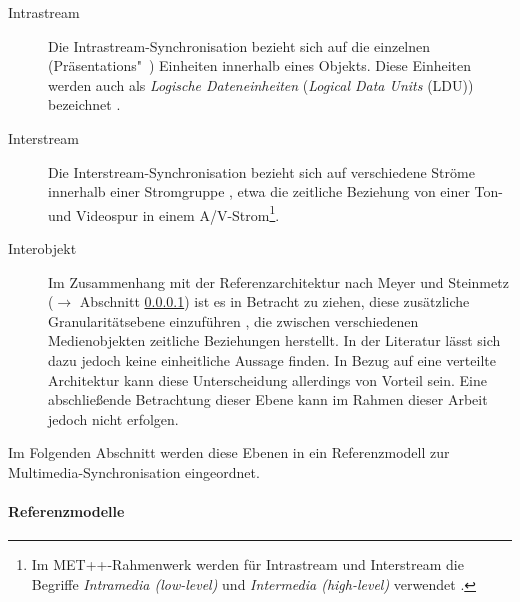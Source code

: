   \begin{description}
    \item[Intrastream] Die Intrastream-Synchronisation bezieht sich auf die einzelnen (Präsen\-tations"~) Einheiten innerhalb eines Objekts. Diese Einheiten werden auch als \emph{Logische Dateneinheiten} (\emph{Logical Data Units} (LDU)) bezeichnet \citep{steinmetz1990spm}.
    \item[Interstream] Die Interstream-Synchronisation bezieht sich auf verschiedene Ströme innerhalb einer Stromgruppe \citep{multimedia_technologie}, etwa die zeitliche Beziehung von einer Ton- und Videospur in einem A/V-Strom\footnote{Im MET++-Rahmenwerk werden für Intrastream und Interstream die Begriffe \emph{Intramedia (low-level)} und \emph{Intermedia (high-level)} verwendet \citep[S. 73]{ackermann1996doo}.}.
    \item[Interobjekt] Im Zusammenhang mit der Referenzarchitektur nach Meyer und Steinmetz ($\to$ Abschnitt \ref{par:referenzmodelle}) ist es in Betracht zu ziehen, diese zusätzliche Granularitätsebene einzuführen \citep[S. 264]{wu2001svo}, die zwischen verschiedenen Medienobjekten zeitliche Beziehungen herstellt. In der Literatur lässt sich dazu jedoch keine einheitliche Aussage finden. In Bezug auf eine verteilte Architektur kann diese Unterscheidung allerdings von Vorteil sein. Eine abschließende Betrachtung dieser Ebene kann im Rahmen dieser Arbeit jedoch nicht erfolgen.
  \end{description}
  
  Im Folgenden Abschnitt werden diese Ebenen in ein Referenzmodell zur Multimedia-Synchronisation eingeordnet.


\paragraph{Referenzmodelle} %
\label{par:referenzmodelle}

